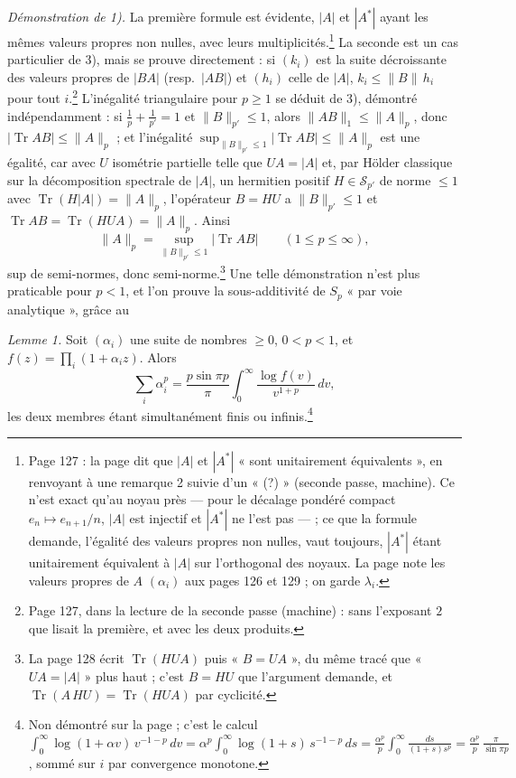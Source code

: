 \documentclass[11pt,a4paper]{article}
\begin{document}
\emph{Démonstration de 1).} La première formule est évidente, $|A|$ et
$|A^{*}|$ ayant les mêmes valeurs propres non nulles, avec leurs
multiplicités.\footnote{Page 127 : la page dit que $|A|$ et $|A^{*}|$ « sont
unitairement équivalents », en renvoyant à une remarque 2 suivie d'un « (?) »
(seconde passe, machine). Ce n'est exact qu'au noyau près --- pour le
décalage pondéré compact $e_n \mapsto e_{n+1}/n$, $|A|$ est injectif et
$|A^{*}|$ ne l'est pas --- ; ce que la formule demande, l'égalité des valeurs
propres non nulles, vaut toujours, $|A^{*}|$ étant unitairement équivalent à
$|A|$ sur l'orthogonal des noyaux. La page note les valeurs propres de $A$
$(\alpha_i)$ aux pages 126 et 129 ; on garde $\lambda_i$.} La seconde est un
cas particulier de 3), mais se prouve directement : si $(k_i)$ est la suite
décroissante des valeurs propres de $|BA|$ (resp.\ $|AB|$) et $(h_i)$ celle
de $|A|$, $k_i \leq \|B\|\,h_i$ pour tout $i$.\footnote{Page 127, dans la
lecture de la seconde passe (machine) : sans l'exposant $2$ que lisait la
première, et avec les deux produits.}
L'inégalité triangulaire pour $p \geq 1$ se déduit de 3), démontré
indépendamment : si $\frac1p + \frac1{p'} = 1$ et $\|B\|_{p'} \leq 1$, alors
$\|AB\|_1 \leq \|A\|_p$, donc $|\operatorname{Tr} AB| \leq \|A\|_p$ ; et
l'inégalité $\sup_{\|B\|_{p'} \leq 1} |\operatorname{Tr} AB| \leq \|A\|_p$
est une égalité, car avec $U$ isométrie partielle telle que $UA = |A|$ et,
par Hölder classique sur la décomposition spectrale de $|A|$, un hermitien
positif $H \in \mathcal{S}_{p'}$ de norme $\leq 1$ avec $\operatorname{Tr}(H|A|)
= \|A\|_p$, l'opérateur $B = HU$ a $\|B\|_{p'} \leq 1$ et $\operatorname{Tr}
AB = \operatorname{Tr}(HUA) = \|A\|_p$. Ainsi
\[
  \|A\|_p = \sup_{\|B\|_{p'} \leq 1} |\operatorname{Tr} AB| \qquad (1 \leq p \leq \infty),
\]
sup de semi-normes, donc semi-norme.\footnote{La page 128 écrit
$\operatorname{Tr}(HUA)$ puis « $B = UA$ », du même tracé que « $UA = |A|$ »
plus haut ; c'est $B = HU$ que l'argument demande, et $\operatorname{Tr}(A\,HU) = \operatorname{Tr}(HUA)$
par cyclicité.} Une telle démonstration n'est plus praticable pour $p < 1$,
et l'on prouve la sous-additivité de $S_p$ « par voie analytique », grâce
au

\emph{Lemme 1.} Soit $(\alpha_i)$ une suite de nombres $\geq 0$, $0 < p <
1$, et $f(z) = \prod_i (1 + \alpha_i z)$. Alors
\[
  \sum_i \alpha_i^p = \frac{p\sin\pi p}{\pi}\int_0^\infty \frac{\log f(v)}{v^{1+p}}\,dv,
\]
les deux membres étant simultanément finis ou infinis.\footnote{Non démontré
sur la page ; c'est le calcul $\int_0^\infty \log(1 + \alpha v)\,v^{-1-p}\,dv
= \alpha^p\int_0^\infty \log(1+s)\,s^{-1-p}\,ds = \frac{\alpha^p}{p}
\int_0^\infty \frac{ds}{(1+s)s^p} = \frac{\alpha^p}{p}\,\frac{\pi}{\sin\pi p}$,
sommé sur $i$ par convergence monotone.}
\end{document}

